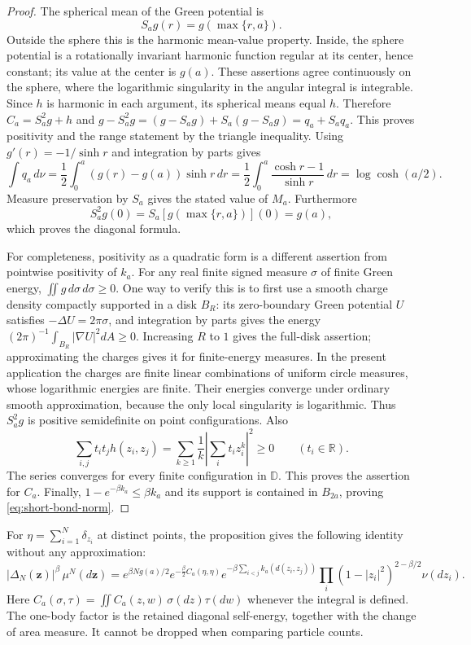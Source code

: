 \documentclass[11pt]{article}
\theoremstyle{remark}\newtheorem{remark}[theorem]{Remark}
\begin{document}
\begin{proof}
The spherical mean of the Green potential is
\[
 S_ag(r)=g(\max\{r,a\}).
\]
Outside the sphere this is the harmonic mean-value property.  Inside,
the sphere potential is a rotationally invariant harmonic function regular
at its center, hence constant; its value at the center is $g(a)$.
These assertions agree continuously on the sphere, where the logarithmic
singularity in the angular integral is integrable.  Since $h$ is harmonic
in each argument, its spherical means equal $h$.  Therefore
$C_a=S_a^2g+h$ and
$g-S_a^2g=(g-S_ag)+S_a(g-S_ag)=q_a+S_aq_a$.
This proves positivity and the range statement by the triangle inequality.
Using $g'(r)=-1/\sinh r$ and integration by parts gives
\[
 \int q_a\,d\nu
 =\frac12\int_0^a(g(r)-g(a))\sinh r\,dr
 =\frac12\int_0^a\frac{\cosh r-1}{\sinh r}\,dr
 =\log\cosh(a/2).
\]
Measure preservation by $S_a$ gives the stated value of $M_a$.
Furthermore
\[
 S_a^2g(0)=S_a[g(\max\{r,a\})](0)=g(a),
\]
which proves the diagonal formula.

For completeness, positivity as a quadratic form is a different assertion
from pointwise positivity of $k_a$.  For any real finite signed measure
$\sigma$ of finite Green energy, $\iint g\,d\sigma\,d\sigma\ge0$.
One way to verify this is to first use a smooth charge density compactly
supported in a disk $B_R$: its zero-boundary Green potential $U$ satisfies
$-\Delta U=2\pi\sigma$, and integration by parts gives the energy
$(2\pi)^{-1}\int_{B_R}|\nabla U|^2dA\ge0$.  Increasing $R$ to $1$
gives the full-disk assertion; approximating the charges gives it for
finite-energy measures.  In the present application the charges are
finite linear combinations of uniform circle measures, whose logarithmic
energies are finite.  Their energies converge under ordinary smooth
approximation, because the only local singularity is logarithmic.
Thus $S_a^2g$ is positive semidefinite on point configurations.  Also
\[
 \sum_{i,j}t_it_jh(z_i,z_j)
 =\sum_{k\ge1}\frac1k\left|\sum_i t_i z_i^k\right|^2\ge0
 \qquad(t_i\in\mathbb R).
\]
The series converges for every finite configuration in $\mathbb D$.
This proves the assertion for $C_a$.  Finally,
$1-e^{-\beta k_a}\le\beta k_a$ and its support is contained in
$B_{2a}$, proving \eqref{eq:short-bond-norm}.
\end{proof}

For $\eta=\sum_{i=1}^N\delta_{z_i}$ at distinct points, the proposition
gives the following identity without any approximation:
\begin{equation}\label{eq:actual-smearing-density}
 |\Delta_N(\mathbf z)|^\beta\,\mu^N(d\mathbf z)
 =e^{\beta Ng(a)/2}
  e^{-\frac\beta2 C_a(\eta,\eta)}
  e^{-\beta\sum_{i<j}k_a(d(z_i,z_j))}
  \prod_i(1-|z_i|^2)^{2-\beta/2}\nu(dz_i).
\end{equation}
Here $C_a(\sigma,\tau)=\iint C_a(z,w)\,\sigma(dz)\tau(dw)$ whenever
the integral is defined.  The one-body factor is the retained diagonal
self-energy, together with the change of area measure.  It cannot be
dropped when comparing particle counts.
\end{document}
